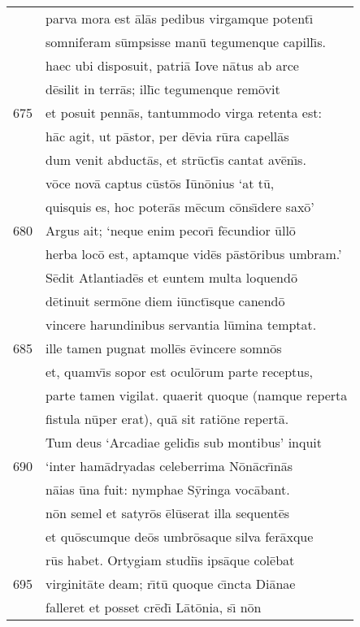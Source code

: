 \documentclass[paper=6in:9in,pagesize=pdftex,
               headinclude=on,footinclude=on,12pt]{scrbook}
\begin{document}
\begin{longtable}[p]{ r l }
 & parva mora est \=al\=as pedibus virgamque potent\={\i}\\ 
 & somniferam s\=umpsisse man\=u tegumenque capill\={\i}s.\\ 
 & haec ubi disposuit, patri\=a Iove n\=atus ab arce\\ 
 & d\=esilit in terr\=as; ill\={\i}c tegumenque rem\=ovit\\ 
675 & et posuit penn\=as, tantummodo virga retenta est:\\ 
 & h\=ac agit, ut p\=astor, per d\=evia r\=ura capell\=as\\ 
 & dum venit abduct\=as, et str\=uct\={\i}s cantat av\=en\={\i}s.\\ 
 & v\=oce nov\=a captus c\=ust\=os I\=un\=onius `at t\=u,\\ 
 & quisquis es, hoc poter\=as m\=ecum c\=ons\={\i}dere sax\=o'\\ 
680 & Argus ait; `neque enim pecor\={\i} f\=ecundior \=ull\=o\\ 
 & herba loc\=o est, aptamque vid\=es p\=ast\=oribus umbram.'\\ 
 & \indent S\=edit Atlantiad\=es et euntem multa loquend\=o\\ 
 & d\=etinuit serm\=one diem i\=unct\={\i}sque canend\=o\\ 
 & vincere harundinibus servantia l\=umina temptat.\\ 
685 & ille tamen pugnat moll\=es \=evincere somn\=os\\ 
 & et, quamv\={\i}s sopor est ocul\=orum parte receptus,\\ 
 & parte tamen vigilat. quaerit quoque (namque reperta\\ 
 & fistula n\=uper erat), qu\=a sit rati\=one repert\=a.\\ 
 & \indent Tum deus `Arcadiae gelid\={\i}s sub montibus' inquit\\ 
690 & `inter ham\=adryadas celeberrima N\=on\=acr\={\i}n\=as\\ 
 & n\=aias \=una fuit: nymphae S\=yringa voc\=abant.\\ 
 & n\=on semel et satyr\=os \=el\=userat illa sequent\=es\\ 
 & et qu\=oscumque de\=os umbr\=osaque silva fer\=axque\\ 
 & r\=us habet. Ortygiam studi\={\i}s ips\=aque col\=ebat\\ 
695 & virginit\=ate deam; r\={\i}t\=u quoque c\={\i}ncta Di\=anae\\ 
 & falleret et posset cr\=ed\={\i} L\=at\=onia, s\={\i} n\=on\\ 

\end{longtable}
\end{document}
